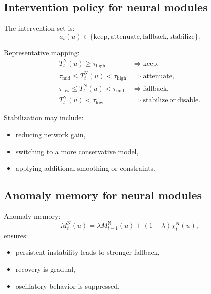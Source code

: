 \documentclass[11pt]{article}
\theoremstyle{definition}
\theoremstyle{plain}
\begin{document}
\subsection{Intervention policy for neural modules}

The intervention set is:
\begin{equation}
a_t(u)\in\{\mathrm{keep},\mathrm{attenuate},\mathrm{fallback},\mathrm{stabilize}\}.
\end{equation}

Representative mapping:
\begin{align}
T^{\mathrm{N}}_t(u)\ge \tau_{\mathrm{high}} &\Rightarrow \mathrm{keep},\\
\tau_{\mathrm{mid}}\le T^{\mathrm{N}}_t(u)<\tau_{\mathrm{high}} &\Rightarrow \mathrm{attenuate},\\
\tau_{\mathrm{low}}\le T^{\mathrm{N}}_t(u)<\tau_{\mathrm{mid}} &\Rightarrow \mathrm{fallback},\\
T^{\mathrm{N}}_t(u)<\tau_{\mathrm{low}} &\Rightarrow \mathrm{stabilize\ or\ disable}.
\end{align}

Stabilization may include:
\begin{itemize}[leftmargin=1.5em]
    \item reducing network gain,
    \item switching to a more conservative model,
    \item applying additional smoothing or constraints.
\end{itemize}


\subsection{Anomaly memory for neural modules}

Anomaly memory:
\begin{equation}
M^{\mathrm{N}}_t(u)=\lambda M^{\mathrm{N}}_{t-1}(u)+(1-\lambda)\chi^{\mathrm{N}}_t(u),
\end{equation}
ensures:
\begin{itemize}[leftmargin=1.5em]
    \item persistent instability leads to stronger fallback,
    \item recovery is gradual,
    \item oscillatory behavior is suppressed.
\end{itemize}
\end{document}
